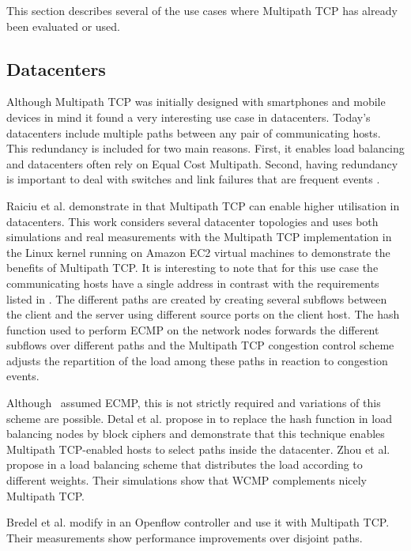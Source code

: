 This section describes several of the use cases where Multipath TCP has already been evaluated or used.

\subsection{Datacenters}

Although Multipath TCP was initially designed with smartphones and mobile devices in mind it found a very interesting use case in datacenters. Today's datacenters include multiple paths between any pair of communicating hosts. This redundancy is included for two main reasons. First, it enables load balancing and datacenters often rely on Equal Cost Multipath. Second, having redundancy is important to deal with switches and link failures that are frequent events \cite{Zhou_WCMP:2014}.

Raiciu et al. demonstrate in \cite{Raiciu_Datacenter:2011} that Multipath TCP can enable higher utilisation in datacenters. This work considers several datacenter topologies and uses both simulations and real measurements with the Multipath TCP implementation in the Linux kernel running on Amazon EC2 virtual machines to demonstrate the benefits of Multipath TCP. It is interesting to note that for this use case the communicating hosts have a single address in contrast with the requirements listed in \cite{rfc6182}. The different paths are created by creating several subflows between the client and the server using different source ports on the client host. The hash function used to perform ECMP on the network nodes forwards the different subflows over different paths and the Multipath TCP congestion control scheme adjusts the repartition of the load among these paths in reaction to congestion events. 

Although~\cite{Raiciu_Datacenter:2011} assumed ECMP, this is not strictly required and variations of this scheme are possible. Detal et al. propose in \cite{Detal_Revisiting:2013} to replace the hash function in load balancing nodes by block ciphers and demonstrate that this technique enables Multipath TCP-enabled hosts to select paths inside the datacenter. Zhou et al. propose in \cite{Zhou_WCMP:2014} a load balancing scheme that distributes the load according to different weights. Their simulations show that WCMP complements nicely Multipath TCP.


Bredel et al. modify in \cite{Bredel_Flow-based:2014} an Openflow controller and use it with Multipath TCP. Their measurements show performance improvements over disjoint paths.

